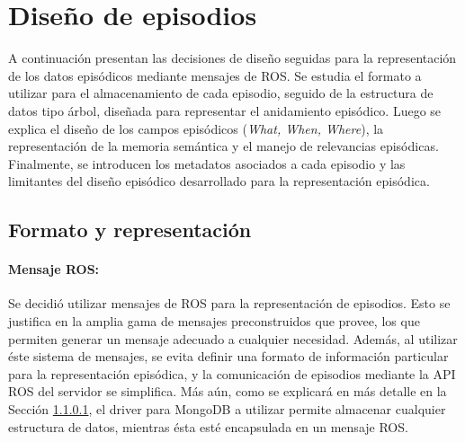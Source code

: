 


\section{Diseño de episodios}

A continuación presentan las decisiones de diseño seguidas para la representación de los datos episódicos mediante mensajes de ROS. Se estudia el formato a utilizar para el almacenamiento de cada episodio, seguido de la estructura de datos tipo árbol, diseñada para representar el anidamiento episódico. Luego se explica el diseño de los campos episódicos (\textit{What, When, Where}), la representación de la memoria semántica y el manejo de relevancias episódicas. Finalmente, se introducen los metadatos asociados a cada episodio y las limitantes del diseño episódico desarrollado para la representación episódica.


\subsection{Formato y representación}

\paragraph{Mensaje ROS:}
Se decidió utilizar mensajes de ROS para la representación de episodios. Esto se justifica en la amplia gama de mensajes preconstruidos que provee, los que permiten generar un mensaje adecuado a cualquier necesidad. Además, al utilizar éste sistema de mensajes, se evita definir una formato de información particular para la representación episódica, y la comunicación de episodios mediante la API ROS del servidor se simplifica. Más aún, como se explicará en más detalle en la Sección \ref{}, el driver para MongoDB a utilizar permite almacenar cualquier estructura de datos, mientras ésta esté encapsulada en un mensaje ROS.

